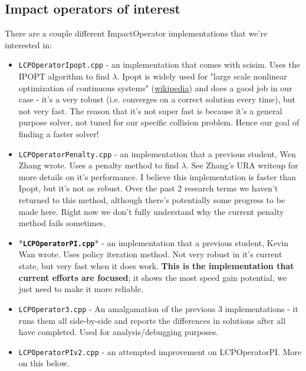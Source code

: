 \documentclass[12pt]{article}
\begin{document}
\subsection{Impact operators of interest}

There are a couple different ImpactOperator implementations that we're interested in:


\begin{itemize}{}{\setlength{\leftmargin}{0.25cm}}
    \item \texttt{LCPOperatorIpopt.cpp} - an implementation that comes with scisim.
    Uses the IPOPT algorithm to find $\lambda$.
    Ipopt is widely used for "large scale nonlinear optimization of continuous systems"
    (\href{https://en.wikipedia.org/wiki/IPOPT}{wikipedia}) and does a good job in our case -
    it's a very robust (i.e. converges on a correct solution every time), but not very fast.
    The reason that it's not super fast is because it's a general purpose solver,
    not tuned for our specific collision problem. Hence our goal of finding a faster solver!
    
    \item \texttt{LCPOperatorPenalty.cpp} - an implementation that a previous student, Wen Zhang wrote.
    Uses a penalty method to find $\lambda$. See Zhang's URA writeup for more details on it's performance.
    I believe this implementation is faster than Ipopt, but it's not as robust.
    Over the past 2 research terms we haven't returned to this method, although there's potentially some progress to be made here.
    Right now we don't fully understand why the current penalty method fails sometimes.

    \item *\textbf{\texttt{LCPOperatorPI.cpp}}* - an implementation that a previous student, Kevin Wan wrote.
    Uses policy iteration method.
    Not very robust in it's current state, but very fast when it does work.
    \textbf{This is the implementation that current efforts are focused};
    it shows the most speed gain potential, we just need to make it more reliable.

    \item \texttt{LCPOperator3.cpp} - 
    An amalgamation of the previous 3 implementations - it runs them all side-by-side and reports the differences in solutions after all have completed.
    Used for analysis/debugging purposes.

    \item \texttt{LCPOperatorPIv2.cpp} - an attempted improvement on LCPOperatorPI.
    More on this below.
    

\end{itemize}
\end{document}
